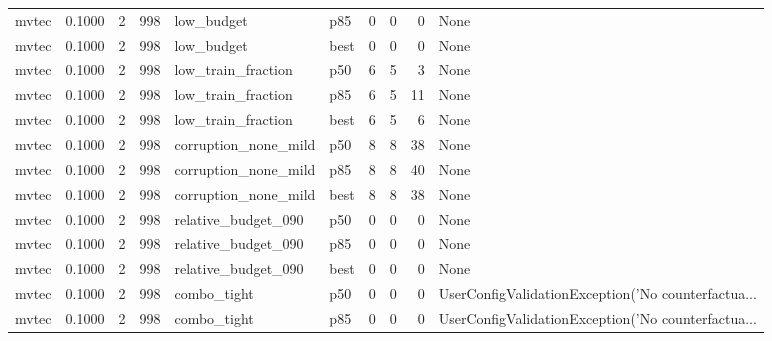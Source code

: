 \begin{tabular}{lrrrllrrrl}
   mvtec &    0.1000 &    2 &    998 &           low\_budget &    p85 &               0 &          0 &       0 &                                               None \\
   mvtec &    0.1000 &    2 &    998 &           low\_budget &   best &               0 &          0 &       0 &                                               None \\
   mvtec &    0.1000 &    2 &    998 &   low\_train\_fraction &    p50 &               6 &          5 &       3 &                                               None \\
   mvtec &    0.1000 &    2 &    998 &   low\_train\_fraction &    p85 &               6 &          5 &      11 &                                               None \\
   mvtec &    0.1000 &    2 &    998 &   low\_train\_fraction &   best &               6 &          5 &       6 &                                               None \\
   mvtec &    0.1000 &    2 &    998 & corruption\_none\_mild &    p50 &               8 &          8 &      38 &                                               None \\
   mvtec &    0.1000 &    2 &    998 & corruption\_none\_mild &    p85 &               8 &          8 &      40 &                                               None \\
   mvtec &    0.1000 &    2 &    998 & corruption\_none\_mild &   best &               8 &          8 &      38 &                                               None \\
   mvtec &    0.1000 &    2 &    998 &  relative\_budget\_090 &    p50 &               0 &          0 &       0 &                                               None \\
   mvtec &    0.1000 &    2 &    998 &  relative\_budget\_090 &    p85 &               0 &          0 &       0 &                                               None \\
   mvtec &    0.1000 &    2 &    998 &  relative\_budget\_090 &   best &               0 &          0 &       0 &                                               None \\
   mvtec &    0.1000 &    2 &    998 &          combo\_tight &    p50 &               0 &          0 &       0 & UserConfigValidationException('No counterfactua... \\
   mvtec &    0.1000 &    2 &    998 &          combo\_tight &    p85 &               0 &          0 &       0 & UserConfigValidationException('No counterfactua... \\

\end{tabular}
